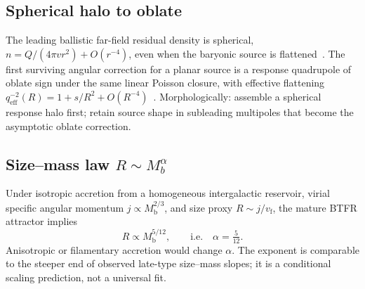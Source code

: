\documentclass[11pt]{article}
\newcommand{\Mb}{M_{\mathrm{b}}}
\newcommand{\vf}{v_{\mathrm{f}}}
\begin{document}
\subsection{Spherical halo to oblate}
The leading ballistic far-field residual density is spherical,
$n=Q/(4\pi v r^{2})+O(r^{-4})$, even when the baryonic source is
flattened~\cite{boyd2026galactic}.
The first surviving angular correction for a planar source is a response quadrupole
of oblate sign under the same linear Poisson closure, with effective flattening
$q_{\mathrm{eff}}^{-2}(R)=1+s/R^{2}+O(R^{-4})$~\cite{boyd2026galactic}.
Morphologically: assemble a spherical response halo first; retain source shape in
subleading multipoles that become the asymptotic oblate correction.

\subsection{\texorpdfstring{Size--mass law $R\sim M_b^{\alpha}$}{Size-mass law}}
Under isotropic accretion from a homogeneous intergalactic reservoir, virial
specific angular momentum $j\propto\Mb^{2/3}$, and size proxy $R\sim j/\vf$, the
mature BTFR attractor implies~\cite{boyd2026galactic}
\begin{equation}
\label{eq:size-mass}
\boxed{R\propto\Mb^{5/12}},
\qquad\text{i.e.}\quad\alpha=\tfrac{5}{12}.
\end{equation}
Anisotropic or filamentary accretion would change $\alpha$.
The exponent is comparable to the steeper end of observed late-type size--mass
slopes; it is a conditional scaling prediction, not a universal fit.
\end{document}
